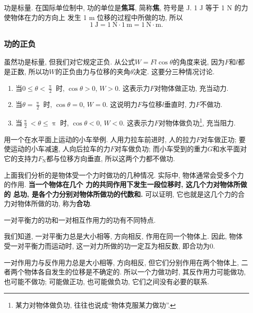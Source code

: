 \documentclass[11pt,a4paper]{ctexbook}
\begin{document}
功是标量. 在国际单位制中, 功的单位是\textbf{焦耳}, 简称\textbf{焦}, 符号是 J. 1 J 等于 1 N 的力使物体在力的方向上
发生 1 m 位移的过程中所做的功, 所以
$$1 \ \mathrm{J} = 1\ \mathrm{N}\cdot 1\ \mathrm{m} = 1\ \mathrm{N\cdot m}.$$

\subsubsection{功的正负}

虽然功是标量, 但我们对它规定正负. 从公式$W = Fl \cos \theta$的角度来说, 因为$F$和$l$都是正数,
所以功$W$的正负由力与位移的夹角$\theta$决定. 这要分三种情况讨论.

\begin{enumerate}
	\item 当$0 \leqslant \theta < \displaystyle\frac{\uppi}{2}$ 时, $\cos \theta > 0$, $W > 0$. 这表示力$F$对物体做正功, 充当动力.\vspace{5pt}

	\item 当$\theta = \displaystyle\frac{\uppi}{2}$ 时, $\cos \theta = 0$, $W = 0$. 这说明力$F$与位移$l$垂直时, 力$F$不做功.\vspace{5pt}

	\item 当$\displaystyle\frac{\uppi}{2}<\theta\leqslant \uppi$ 时, $\cos \theta < 0$, $W < 0$. 这表示力$F$对物体做负功\footnote{某力对物体做负功, 往往也说成``物体克服某力做功''.}, 充当阻力.\vspace{5pt}
\end{enumerate}

用一个在水平面上运动的小车举例. 人用力拉车前进时, 人的拉力$F$对车做正功; 要使运动的小车减速, 人向后拉车的力$F$对车做负功;
而小车受到的重力$G$和水平面对它的支持力$F_\text{N}$都与位移方向垂直, 所以这两个力都不做功.

上面我们分析的是物体受一个力时做功的几种情况.
实际中, 物体通常会受多个力的作用. \textbf{当一个物体在几个
力的共同作用下发生一段位移时,  这几个力对物体所做的
总功,  是各个力分别对物体所做功的代数和.} 可以证明,
它也就是这几个力的合力对物体所做的功, 称为\textbf{合功}.

{\kaishu 一对平衡力的功和一对相互作用力的功有不同特点.}

我们知道, 一对平衡力总是大小相等, 方向相反, 作用在同一个物体上.
因此, 物体受一对平衡力而运动时, 这一对力所做的功一定互为相反数, 即合功为0.

一对作用力与反作用力总是大小相等, 方向相反, 但它们分别作用在两个物体上,
二者两个物体各自发生的位移是不确定的.
所以一个力做功时, 其反作用力可能做功, 也可能不做功;
可能做正功, 也可能做负功, 它们之间没有必要的联系.
\end{document}

